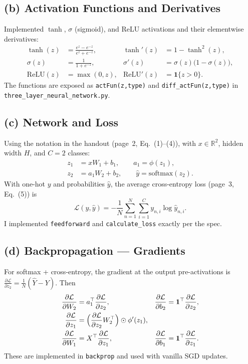 \documentclass[11pt]{article}
\begin{document}
\subsection{(b) Activation Functions and Derivatives}
Implemented \(\tanh\), \(\sigma\) (sigmoid), and ReLU activations and their elementwise derivatives:\vspace{.2em}
\begin{align*}
  \tanh(z) &= \frac{e^{z} - e^{-z}}{e^{z} + e^{-z}}, & \tanh'(z) &= 1 - \tanh^2(z),\\
  \sigma(z) &= \frac{1}{1+e^{-z}}, & \sigma'(z) &= \sigma(z)\bigl(1-\sigma(z)\bigr),\\
  \mathrm{ReLU}(z) &= \max(0,z), & \mathrm{ReLU}'(z) &= \mathbf{1}\{z>0\}.
\end{align*}
The functions are exposed as \verb|actFun(z,type)| and \verb|diff_actFun(z,type)| in \texttt{three\_layer\_neural\_network.py}.

\subsection{(c) Network and Loss}
Using the notation in the handout (page~2, Eq.~(1)--(4)), with \(x\in\mathbb{R}^2\), hidden width \(H\), and \(C=2\) classes:
\begin{align}
z_1 &= x W_1 + b_1, \qquad a_1 = \phi(z_1),\\
z_2 &= a_1 W_2 + b_2, \qquad \hat{y} = \mathrm{softmax}(z_2).
\end{align}
With one-hot \(y\) and probabilities \(\hat{y}\), the average cross-entropy loss (page~3, Eq.~(5)) is
\begin{equation}
  \mathcal{L}(y,\hat{y}) = -\frac{1}{N}\sum_{n=1}^N \sum_{i=1}^C y_{n,i}\log \hat{y}_{n,i}.
\end{equation}
I implemented \verb|feedforward| and \verb|calculate_loss| exactly per the spec.

\subsection{(d) Backpropagation --- Gradients}
For softmax + cross-entropy, the gradient at the output pre-activations is
\(\frac{\partial \mathcal{L}}{\partial z_2} = \frac{1}{N}(\hat{Y}-Y)\).
Then
\begin{align}
\frac{\partial \mathcal{L}}{\partial W_2} &= a_1^\top \frac{\partial \mathcal{L}}{\partial z_2}, &
\frac{\partial \mathcal{L}}{\partial b_2} &= \mathbf{1}^\top \frac{\partial \mathcal{L}}{\partial z_2},\\
\frac{\partial \mathcal{L}}{\partial z_1} &= \Bigl(\frac{\partial \mathcal{L}}{\partial z_2} W_2^\top\Bigr)\odot \phi'(z_1),\\
\frac{\partial \mathcal{L}}{\partial W_1} &= X^\top \frac{\partial \mathcal{L}}{\partial z_1}, &
\frac{\partial \mathcal{L}}{\partial b_1} &= \mathbf{1}^\top \frac{\partial \mathcal{L}}{\partial z_1}.
\end{align}
These are implemented in \verb|backprop| and used with vanilla SGD updates.
\end{document}
